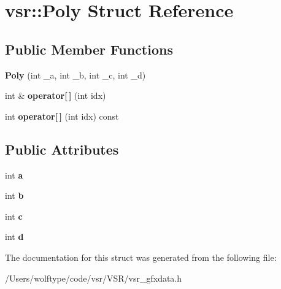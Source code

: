 \hypertarget{structvsr_1_1_poly}{\section{vsr\-:\-:Poly Struct Reference}
\label{structvsr_1_1_poly}
}
\subsection*{Public Member Functions}
\begin{DoxyCompactItemize}
\item 
\hypertarget{structvsr_1_1_poly_a103d8328b77067f979338b5df6cdec27}{{\bfseries Poly} (int \-\_\-a, int \-\_\-b, int \-\_\-c, int \-\_\-d)}\label{structvsr_1_1_poly_a103d8328b77067f979338b5df6cdec27}

\item 
\hypertarget{structvsr_1_1_poly_aaf694aee27b52ac6455a4373d301b0af}{int \& {\bfseries operator\mbox{[}$\,$\mbox{]}} (int idx)}\label{structvsr_1_1_poly_aaf694aee27b52ac6455a4373d301b0af}

\item 
\hypertarget{structvsr_1_1_poly_a4f127e46a3c4e1d568b5d7bcef89ea5b}{int {\bfseries operator\mbox{[}$\,$\mbox{]}} (int idx) const }\label{structvsr_1_1_poly_a4f127e46a3c4e1d568b5d7bcef89ea5b}

\end{DoxyCompactItemize}
\subsection*{Public Attributes}
\begin{DoxyCompactItemize}
\item 
\hypertarget{structvsr_1_1_poly_a145f2f6ccb6bcaf9ccfa790cd8f3514f}{int {\bfseries a}}\label{structvsr_1_1_poly_a145f2f6ccb6bcaf9ccfa790cd8f3514f}

\item 
\hypertarget{structvsr_1_1_poly_aacefdcb23cba3530e8047d67446e6145}{int {\bfseries b}}\label{structvsr_1_1_poly_aacefdcb23cba3530e8047d67446e6145}

\item 
\hypertarget{structvsr_1_1_poly_a0a91a505645ef78a9834085567dffe04}{int {\bfseries c}}\label{structvsr_1_1_poly_a0a91a505645ef78a9834085567dffe04}

\item 
\hypertarget{structvsr_1_1_poly_ad0103847936aac77cc4df7f3152037d0}{int {\bfseries d}}\label{structvsr_1_1_poly_ad0103847936aac77cc4df7f3152037d0}

\end{DoxyCompactItemize}


The documentation for this struct was generated from the following file\-:\begin{DoxyCompactItemize}
\item 
/\-Users/wolftype/code/vsr/\-V\-S\-R/vsr\-\_\-gfxdata.\-h\end{DoxyCompactItemize}
